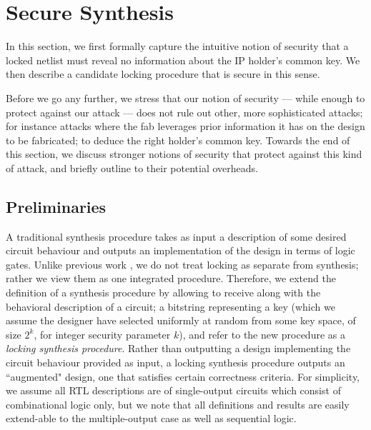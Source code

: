 \section{Secure Synthesis}

In this section, we first formally capture the intuitive notion of security that a locked netlist must reveal no information about the IP holder's common key. 
We then describe a candidate locking procedure that is secure in this sense. 


Before we go any further, we stress that our notion of security --- while enough to protect against our attack --- does not rule out other, more sophisticated attacks; for instance attacks where the fab leverages prior information it has on the design to be fabricated; to deduce the right holder's common key. Towards  the end of this section, we discuss stronger notions of security that protect against this kind of attack, and briefly outline to their potential overheads.

\subsection{Preliminaries}
A traditional synthesis procedure takes as input a description of some desired circuit behaviour and outputs an implementation of the design in terms of logic gates. Unlike previous work \cite{}, we do not treat locking as separate from synthesis; rather we view them as one integrated procedure. Therefore, we extend the definition of a synthesis procedure by allowing to receive along with the behavioral description of a circuit; a bitstring representing a key (which we assume the designer have selected uniformly at random from some key space, of size $2^k$, for integer security parameter $k$), and refer to the new procedure as a \emph{locking synthesis procedure}. Rather than outputting a design implementing the circuit behaviour provided as input, a locking synthesis procedure outputs an ``augmented" design, one that satisfies certain correctness criteria. For simplicity, we assume all RTL descriptions are of single-output circuits which consist of combinational logic only, but we note that all definitions and results are easily extend-able to the multiple-output case as well as sequential logic.

